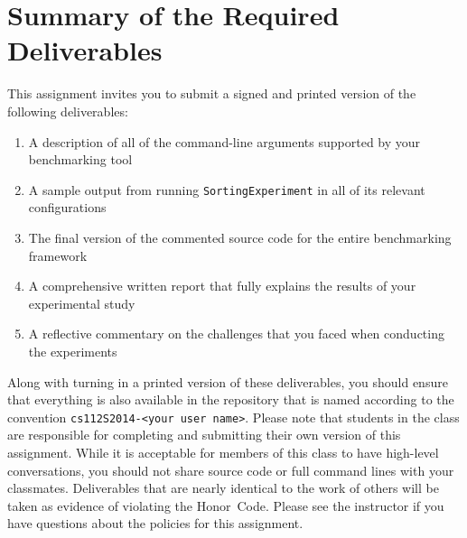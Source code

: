 \section*{Summary of the Required Deliverables}

  This assignment invites you to submit a signed and printed version of the following deliverables: 

  \begin{enumerate} 
  \itemsep0pt
  \item A description of all of the command-line arguments supported by your benchmarking tool 

  \item A sample output from running {\tt SortingExperiment} in all of its relevant configurations

  \item The final version of the commented source code for the entire benchmarking framework 

  \item A comprehensive written report that fully explains the results of your experimental study

  \item A reflective commentary on the challenges that you faced when conducting the experiments
   
  \end{enumerate}

  Along with turning in a printed version of these deliverables, you should ensure that everything is also available in
  the repository that is named according to the convention {\tt cs112S2014-<your user name>}. Please note that students
  in the class are responsible for completing and submitting their own version of this assignment.    While it is
  acceptable for members of this class to have high-level conversations, you should not share source code or full
  command lines with your classmates.  Deliverables that are nearly identical to the work of others will be taken as
  evidence of violating the \mbox{Honor Code}.  Please see the instructor if you have questions about the policies for
  this assignment.

  
